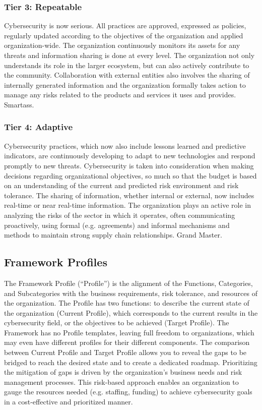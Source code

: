 \subsubsection{Tier 3: Repeatable}
Cybersecurity is now serious. All practices are approved, expressed as policies, regularly updated according to the objectives of the organization and applied organization-wide. The organization continuously monitors its assets for any threats and information sharing is done at every level. The organization not only understands its role in the larger ecosystem, but can also actively contribute to the community. Collaboration with external entities also involves the sharing of internally generated information and the organization formally takes action to manage any risks related to the products and services it uses and provides. Smartass.
\subsubsection{Tier 4: Adaptive}
Cybersecurity practices, which now also include lessons learned and predictive indicators, are continuously developing to adapt to new technologies and respond promptly to new threats. Cybersecurity is taken into consideration when making decisions regarding organizational objectives, so much so that the budget is based on an understanding of the current and predicted risk environment and risk tolerance. The sharing of information, whether internal or external, now includes real-time or near real-time information. The organization plays an active role in analyzing the risks of the sector in which it operates, often communicating proactively, using formal (e.g. agreements) and informal mechanisms and methods to maintain strong supply chain relationships. Grand Master.
\subsection{Framework Profiles}
The Framework Profile (“Profile”) is the alignment of the Functions, Categories, and Subcategories with the business requirements, risk tolerance, and resources of the organization. The Profile has two functions: to describe the current state of the organization (Current Profile), which corresponds to the current results in the cybersecurity field, or the objectives to be achieved (Target Profile). The Framework has no Profile templates, leaving full freedom to organizations, which may even have different profiles for their different components. The comparison between Current Profile and Target Profile allows you to reveal the gaps to be bridged to reach the desired state and to create a dedicated roadmap. Prioritizing the mitigation of gaps is driven by the organization’s business needs and risk management processes. This risk-based approach enables an organization to gauge the resources needed (e.g. staffing, funding) to achieve cybersecurity goals in a cost-effective and prioritized manner.
